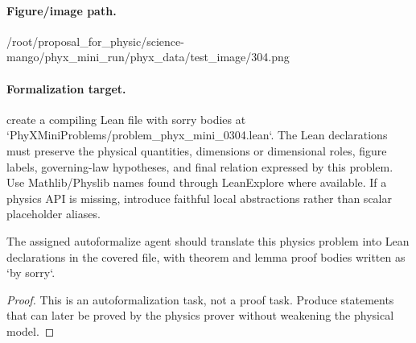 \paragraph{Figure/image path.}
/root/proposal\_for\_physic/science-mango/phyx\_mini\_run/phyx\_data/test\_image/304.png

\paragraph{Formalization target.}
create a compiling Lean file with sorry bodies at `PhyXMiniProblems/problem\_phyx\_mini\_0304.lean`. The Lean declarations must preserve the physical quantities, dimensions or dimensional roles, figure labels, governing-law hypotheses, and final relation expressed by this problem.
Use Mathlib/Physlib names found through LeanExplore where available. If a physics API is missing, introduce faithful local abstractions rather than scalar placeholder aliases.

\begin{theorem}
\label{thm:physics:phyx_mini_0304:target}
The assigned autoformalize agent should translate this physics problem into Lean declarations in the covered file, with theorem and lemma proof bodies written as `by sorry`.
\end{theorem}
\begin{proof}
This is an autoformalization task, not a proof task. Produce statements that can later be proved by the physics prover without weakening the physical model.
\end{proof}

